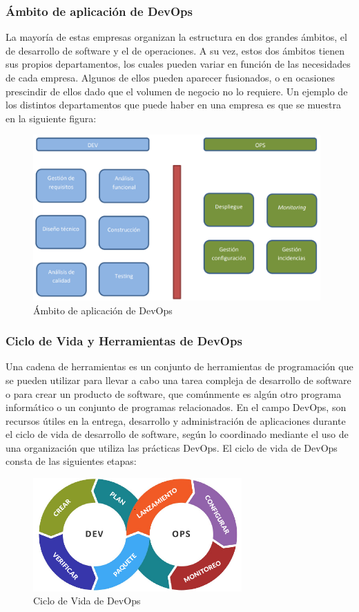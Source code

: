 \documentclass[preprint,12pt]{elsarticle}
\begin{document}
\subsubsection{\textbf{Ámbito de aplicación de DevOps}}
La mayoría de estas empresas organizan la estructura en dos grandes ámbitos, el de desarrollo de software y el de operaciones. A su vez, estos dos ámbitos tienen sus propios departamentos, los cuales pueden variar en función de las necesidades de cada empresa. Algunos de ellos pueden aparecer fusionados, o en
ocasiones prescindir de ellos dado que el volumen de negocio no lo requiere. Un ejemplo de los distintos departamentos que puede haber en una empresa es que se muestra en la siguiente figura: \cite{Jimenez2016}   
\begin{figure}[htb]
	\begin{center}
		\includegraphics[width=11cm]{./IMAGENES/aplicacion_devops} 
		\caption{Ámbito de aplicación de DevOps}
	\end{center}
\end{figure}


\subsubsection{\textbf{Ciclo de Vida y Herramientas de DevOps}}
Una cadena de herramientas es un conjunto de herramientas de programación que se pueden utilizar para llevar a cabo una tarea compleja de desarrollo de software o para crear un producto de software, que comúnmente es algún otro programa informático o un conjunto de programas relacionados. En el campo DevOps, son recursos útiles en la entrega, desarrollo y administración de aplicaciones durante el ciclo de vida de desarrollo de software, según lo coordinado mediante el uso de una organización que utiliza las prácticas DevOps.\cite{Perez2018} 
El ciclo de vida de DevOps consta de las siguientes etapas: \cite{Platzi2019}   
\begin{figure}[htb]
	\begin{center}
		\includegraphics[width=8cm]{./IMAGENES/ciclo_devops} 
		\caption{Ciclo de Vida de DevOps}
	\end{center}
\end{figure}
\end{document}

